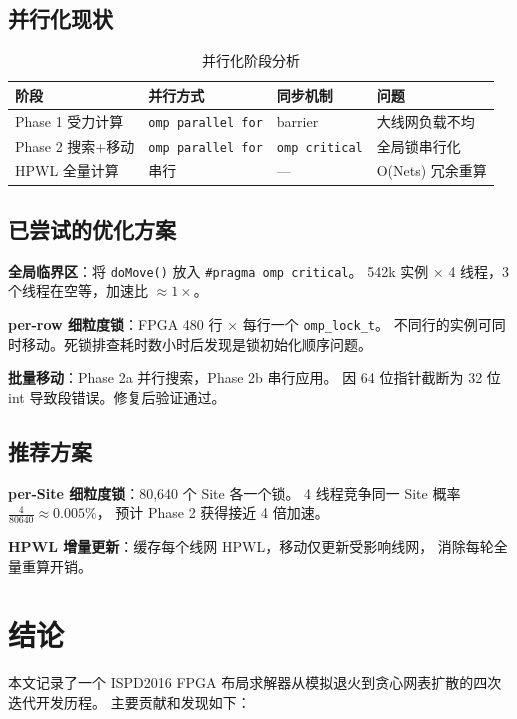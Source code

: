 \documentclass[10.5pt,compsoc]{CjC}
\theoremstyle{mystyle}
\begin{document}
\subsection{并行化现状}

\begin{table}[H]
\centering
\caption{并行化阶段分析}
\scriptsize
\setlength{\tabcolsep}{2pt}
\begin{tabular}{@{}p{1.7cm}p{2.8cm}p{1.9cm}p{2.2cm}@{}}
\toprule
阶段 & 并行方式 & 同步机制 & 问题 \\
\midrule
Phase 1 受力计算 & \texttt{omp parallel for} & barrier & 大线网负载不均 \\
Phase 2 搜索+移动 & \texttt{omp parallel for} & \texttt{omp critical} & 全局锁串行化 \\
HPWL 全量计算 & 串行 & --- & O(Nets) 冗余重算 \\
\bottomrule
\end{tabular}
\end{table}

\subsection{已尝试的优化方案}

\textbf{全局临界区}：将 \texttt{doMove()} 放入 \texttt{\#pragma omp critical}。
542k 实例 × 4 线程，3 个线程在空等，加速比 $\approx 1\times$。

\textbf{per-row 细粒度锁}：FPGA 480 行 × 每行一个 \texttt{omp\_lock\_t}。
不同行的实例可同时移动。死锁排查耗时数小时后发现是锁初始化顺序问题。

\textbf{批量移动}：Phase 2a 并行搜索，Phase 2b 串行应用。
因 64 位指针截断为 32 位 int 导致段错误。修复后验证通过。

\subsection{推荐方案}

\textbf{per-Site 细粒度锁}：80,640 个 Site 各一个锁。
4 线程竞争同一 Site 概率 $\frac{4}{80640} \approx 0.005\%$，
预计 Phase 2 获得接近 4 倍加速。

\textbf{HPWL 增量更新}：缓存每个线网 HPWL，移动仅更新受影响线网，
消除每轮全量重算开销。

\section{结论}

本文记录了一个 ISPD2016 FPGA 布局求解器从模拟退火到贪心网表扩散的四次迭代开发历程。
主要贡献和发现如下：
\end{document}
